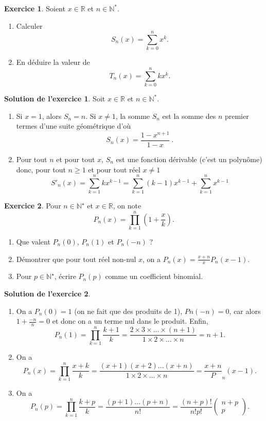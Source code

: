 \documentclass[a4paper, 11pt,openany]{article}%
\theoremstyle{plain}
\theoremstyle{definition}
\newtheorem{exo}{Exercice}
\newtheorem{sol}{Solution de l'exercice}
\theoremstyle{remark}
\newcommand{\R}{\mathbb{R}}
\newcommand{\N}{\mathbb{N}}
\begin{document}
\begin{exo}
	Soient $x\in \R$ et $n\in \N^*$.
	\begin{enumerate}
		\item Calculer \[ S_n(x) = \sum_{k=0}^n x^k.\]
		\item En déduire la valeur de $$T_n(x) = \sum_{k=0}^n kx^k.$$
	\end{enumerate}
\end{exo}
%
\begin{sol}
	Soit $x\in \R$ et $n\in \N^*$.
	\begin{enumerate}
		\item Si $x=1$, alors $S_n = n$. Si $x\ne 1$, la somme $S_n$ est la somme des $n$ premier termes d'une suite géométrique d'où 
		\[
			S_n(x) = \frac{1-x^{n+1}}{1-x} \ .
		\]
		\item Pour tout $n$ et pour tout $x$, $S_n$ est une fonction dérivable (c'est un polynôme) donc, pour tout $n\geqslant 1$ et pour tout réel $x\ne 1$
		\[
			S'_n(x) = \sum_{k=1}^n kx^{k-1} = \sum_{k=1}^n (k-1)x^{k-1} + \sum_{k=1}^n x^{k-1}
		\]
	\end{enumerate}
\end{sol}
   
\begin{exo}
Pour $n \in \N^{\star}$ et $x \in \R$, on note $$P_n(x)= \prod_{k=1}^n \left(1+ \frac{x}{k} \right).$$
\begin{enumerate}
\item Que valent $P_n(0)$, $P_n(1)$ et $P_n(-n)$ ?
\item Démontrer que pour tout réel non-nul $x$, on a $\displaystyle{P_n(x)= \frac{x+n}{x} P_n(x-1)}$.
\item Pour $p \in \N^{\star}$, écrire $P_n(p)$ comme un coefficient binomial.
\end{enumerate}
\end{exo}

\begin{sol}
	\begin{enumerate}
		\item On a $P_n(0)=1$ (on ne fait que des produits de 1), $Pn(-n)=0$, car alors $1+\frac{-n}{n}=0$ et donc on a un terme nul dans le produit. Enfin, 
		\[ P_n(1)= \prod_{k=1}^n  \frac{k+1}{k} = \frac{2 \times 3 \times ... \times (n+1)}{1 \times 2 \times ... \times n} = n+1.\]
		\item On a 
		$$P_n(x)= \prod_{k=1}^n \frac{x+k}{k} = \frac{(x+1) (x+2) ... (x+n)}{1 \times 2 \times ... \times n } = \frac{x+n} P_n(x-1).$$
				\item On a 
		$$P_n(p)= \prod_{k=1}^n \frac{k+p}{k} = \frac{(p+1) ... (p+n)}{n!} = \frac{(n+p)!}{n! p!} \begin{pmatrix} n+p \\ p \end{pmatrix}.$$
	\end{enumerate}
\end{sol}
\end{document}
